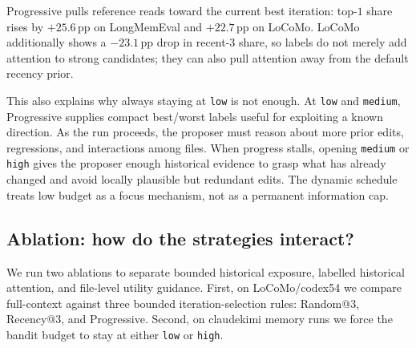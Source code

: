 \begin{table}[t]
\centering
\small
\caption{Reference-read target shares. Reads are bucketed by candidate rank or
recency at prompt-build time and aggregated over two claudekimi runs per cell.}
\label{tab:top1_attention}
\end{table}

Progressive pulls reference reads toward the current best iteration: top-$1$
share rises by $+25.6$\,pp on LongMemEval and $+22.7$\,pp on LoCoMo. LoCoMo
additionally shows a $-23.1$\,pp drop in recent-$3$ share, so labels do not
merely add attention to strong candidates; they can also pull attention away
from the default recency prior.

This also explains why always staying at \texttt{low} is not enough. At
\texttt{low} and \texttt{medium}, Progressive supplies compact best/worst
labels useful for exploiting a known direction. As the run proceeds, the
proposer must reason about more prior edits, regressions, and interactions
among files. When progress stalls, opening \texttt{medium} or \texttt{high}
gives the proposer enough historical evidence to grasp what has already
changed and avoid locally plausible but redundant edits. The dynamic
schedule treats low budget as a focus mechanism, not as a permanent
information cap.

\subsection{Ablation: how do the strategies interact?}
\label{sec:ablation}

We run two ablations to separate bounded historical exposure, labelled
historical attention, and file-level utility guidance. First, on
LoCoMo/codex54 we compare full-context against three bounded
iteration-selection rules: Random@$3$, Recency@$3$, and Progressive.
Second, on claudekimi memory runs we force the bandit budget to stay at
either \texttt{low} or \texttt{high}.

